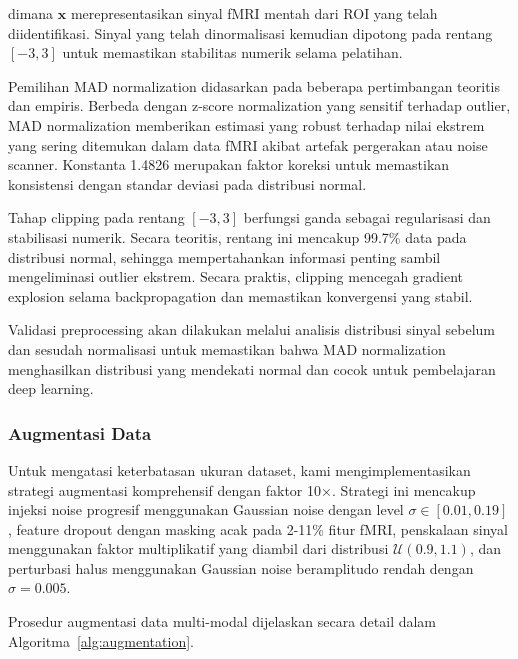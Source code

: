 dimana $\mathbf{x}$ merepresentasikan sinyal fMRI mentah dari ROI yang telah diidentifikasi. Sinyal yang telah dinormalisasi kemudian dipotong pada rentang $[-3, 3]$ untuk memastikan stabilitas numerik selama pelatihan.

Pemilihan MAD normalization didasarkan pada beberapa pertimbangan teoritis dan empiris. Berbeda dengan z-score normalization yang sensitif terhadap outlier, MAD normalization memberikan estimasi yang robust terhadap nilai ekstrem yang sering ditemukan dalam data fMRI akibat artefak pergerakan atau noise scanner. Konstanta 1.4826 merupakan faktor koreksi untuk memastikan konsistensi dengan standar deviasi pada distribusi normal.

Tahap clipping pada rentang $[-3, 3]$ berfungsi ganda sebagai regularisasi dan stabilisasi numerik. Secara teoritis, rentang ini mencakup 99.7\% data pada distribusi normal, sehingga mempertahankan informasi penting sambil mengeliminasi outlier ekstrem. Secara praktis, clipping mencegah gradient explosion selama backpropagation dan memastikan konvergensi yang stabil.

Validasi preprocessing akan dilakukan melalui analisis distribusi sinyal sebelum dan sesudah normalisasi untuk memastikan bahwa MAD normalization menghasilkan distribusi yang mendekati normal dan cocok untuk pembelajaran deep learning.

\subsubsection{Augmentasi Data}
Untuk mengatasi keterbatasan ukuran dataset, kami mengimplementasikan strategi augmentasi komprehensif dengan faktor 10×. Strategi ini mencakup injeksi noise progresif menggunakan Gaussian noise dengan level $\sigma \in [0.01, 0.19]$, feature dropout dengan masking acak pada 2-11\% fitur fMRI, penskalaan sinyal menggunakan faktor multiplikatif yang diambil dari distribusi $\mathcal{U}(0.9, 1.1)$, dan perturbasi halus menggunakan Gaussian noise beramplitudo rendah dengan $\sigma = 0.005$.

Prosedur augmentasi data multi-modal dijelaskan secara detail dalam Algoritma~\ref{alg:augmentation}.

